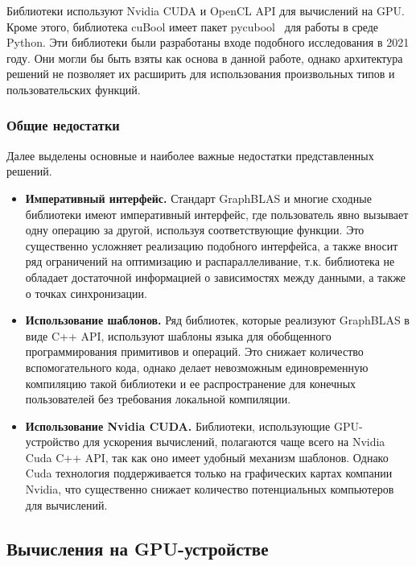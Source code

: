 Библиотеки используют Nvidia CUDA и OpenCL API для вычислений на GPU. Кроме этого, библиотека cuBool имеет пакет pycubool~\cite{net:pycubool} для работы в среде Python. Эти библиотеки были разработаны входе подобного исследования в 2021 году. Они могли бы быть взяты как основа в данной работе, однако архитектура решений не позволяет их расширить для использования произвольных типов и пользовательских функций.

\subsubsection*{Общие недостатки}

Далее выделены основные и наиболее важные недостатки представленных решений.

\begin{itemize}
    \item \textbf{Императивный интерфейс.} Стандарт GraphBLAS и многие сходные библиотеки имеют императивный интерфейс, где пользователь явно вызывает одну операцию за другой, используя соответствующие функции. Это существенно усложняет реализацию подобного интерфейса, а также вносит ряд ограничений на оптимизацию и распараллеливание, т.к. библиотека не обладает достаточной информацией о зависимостях между данными, а также о точках синхронизации.
    
    \item \textbf{Использование шаблонов.} Ряд библиотек, которые реализуют GraphBLAS в виде C++ API, используют шаблоны языка для обобщенного программирования примитивов и операций. Это снижает количество вспомогательного кода, однако делает невозможным единовременную компиляцию такой библиотеки и ее распространение для конечных пользователей без требования локальной компиляции. 
    
    \item \textbf{Использование Nvidia CUDA.} Библиотеки, использующие GPU-устройство для ускорения вычислений, полагаются чаще всего на Nvidia Cuda C++ API, так как оно имеет удобный механизм шаблонов. Однако Cuda технология поддерживается только на графических картах компании Nvidia, что существенно снижает количество потенциальных компьютеров для вычислений.
\end{itemize}

\subsection{Вычисления на GPU-устройстве}


